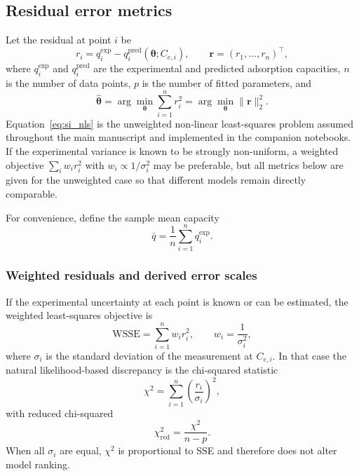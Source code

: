 \documentclass[journal=jacsat,manuscript=article]{achemso}
\begin{document}
\subsection{Residual error metrics}
\label{sec:si_residuals}

Let the residual at point $i$ be
\begin{equation}
	r_i = q_i^{\exp} - q_i^{\mathrm{pred}}(\boldsymbol{\theta}; C_{e,i}),
	\qquad
	\mathbf{r} = (r_1,\dots,r_n)^\top,
	\label{eq:si_residual_vector}
\end{equation}
where $q_i^{\exp}$ and $q_i^{\mathrm{pred}}$ are the experimental and
predicted adsorption capacities, $n$ is the number of data points, $p$
is the number of fitted parameters, and
\begin{equation}
	\hat{\boldsymbol{\theta}}
	=
	\arg\min_{\boldsymbol{\theta}}
	\sum_{i=1}^{n} r_i^2
	=
	\arg\min_{\boldsymbol{\theta}} \|\mathbf{r}\|_2^2.
	\label{eq:si_nls}
\end{equation}
Equation~\eqref{eq:si_nls} is the unweighted non-linear least-squares
problem assumed throughout the main manuscript and implemented in the
companion notebooks. If the experimental variance is known to be
strongly non-uniform, a weighted objective
$\sum_i w_i r_i^2$ with $w_i \propto 1/\sigma_i^2$ may be preferable,
but all metrics below are given for the unweighted case so that
different models remain directly comparable.

For convenience, define the sample mean capacity
\begin{equation}
	\bar{q} = \frac{1}{n}\sum_{i=1}^{n} q_i^{\exp}.
	\label{eq:si_qbar}
\end{equation}

\subsubsection{Weighted residuals and derived error scales}

If the experimental uncertainty at each point is known or can be
estimated, the weighted least-squares objective is
\begin{equation}
	\mathrm{WSSE}
	=
	\sum_{i=1}^{n} w_i r_i^2,
	\qquad
	w_i = \frac{1}{\sigma_i^2},
	\label{eq:si_WSSE}
\end{equation}
where $\sigma_i$ is the standard deviation of the measurement at
$C_{e,i}$. In that case the natural likelihood-based discrepancy is the
chi-squared statistic
\begin{equation}
	\chi^2
	=
	\sum_{i=1}^{n}
	\left(\frac{r_i}{\sigma_i}\right)^2,
	\label{eq:si_chi2}
\end{equation}
with reduced chi-squared
\begin{equation}
	\chi^2_{\mathrm{red}}
	=
	\frac{\chi^2}{n-p}.
	\label{eq:si_chi2red}
\end{equation}
When all $\sigma_i$ are equal, $\chi^2$ is proportional to SSE and
therefore does not alter model ranking.
\end{document}
